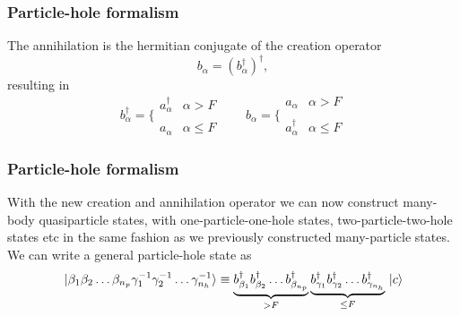 \frame
{
  \frametitle{Particle-hole formalism}
\begin{small}
{\scriptsize
The annihilation is the hermitian conjugate of the creation operator
\[
	b_\alpha = (b_\alpha^\dagger)^\dagger,
\]
resulting in
\begin{equation}
	b_\alpha^\dagger = \Bigg\{ \begin{array}{ll}
		a_\alpha^\dagger & \alpha > F \\
		\\
		a_\alpha & \alpha \leq F
	\end{array} \qquad 
	b_\alpha = \Bigg\{ \begin{array}{ll}
		a_\alpha & \alpha > F \\
		\\
		 a_\alpha^\dagger & \alpha \leq F
	\end{array} \label{eq:2-54}
\end{equation}
}
\end{small}
}


\frame
{
  \frametitle{Particle-hole formalism}
\begin{small}
{\scriptsize
With the new creation and annihilation operator  we can now construct 
many-body quasiparticle states, with one-particle-one-hole states, two-particle-two-hole
states etc in the same fashion as we previously constructed many-particle states. 
We can write a general particle-hole state as
\begin{equation}
	\ket{\beta_1\beta_2\dots \beta_{n_p} \gamma_1^{-1} \gamma_2^{-1} \dots \gamma_{n_h}^{-1}} \equiv
		\underbrace{b_{\beta_1}^\dagger b_{\beta_2}^\dagger \dots b_{\beta_{n_p}}^\dagger}_{>F}
		\underbrace{b_{\gamma_1}^\dagger b_{\gamma_2}^\dagger \dots b_{\gamma_{n_h}}^\dagger}_{\leq F} \ket{c}
		\label{eq:2-56}
\end{equation}
}
\end{small}
}


